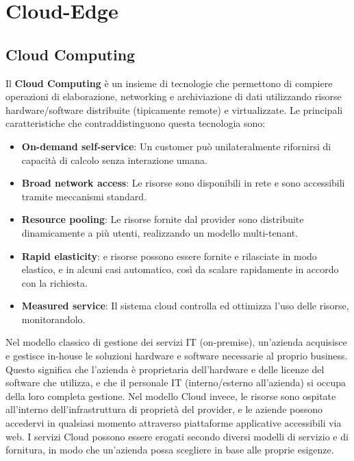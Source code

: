\chapter{Cloud-Edge}

\section{Cloud Computing}
Il \textbf{Cloud Computing} è un insieme di tecnologie che permettono di compiere operazioni
di elaborazione, networking e archiviazione di dati utilizzando risorse hardware/software distribuite (tipicamente remote) e virtualizzate. Le principali caratteristiche che contraddistinguono questa tecnologia sono:
\begin{itemize}
	\item \textbf{On-demand self-service}: Un customer può unilateralmente rifornirsi di
	capacità di calcolo senza interazione umana.
	\item \textbf{Broad network access}: Le risorse sono disponibili in rete e sono accessibili
	tramite meccanismi standard.
	\item \textbf{Resource pooling}: Le risorse fornite dal provider sono distribuite
	dinamicamente a più utenti, realizzando un modello multi-tenant.
	\item \textbf{Rapid elasticity}: e risorse possono essere fornite e rilasciate in modo elastico, e in alcuni casi automatico, così da scalare rapidamente in accordo con la
	richiesta.
	\item \textbf{Measured service}: Il sistema cloud controlla ed ottimizza l'uso delle risorse,
	monitorandolo.
\end{itemize}
Nel modello classico di gestione dei servizi IT (on-premise), un’azienda acquisisce e
gestisce in-house le soluzioni hardware e software necessarie al proprio business. Questo significa che l’azienda è proprietaria dell’hardware e delle licenze del software che utilizza, e che il personale IT (interno/esterno all’azienda) si occupa della loro completa gestione. Nel modello Cloud invece, le risorse sono ospitate all’interno dell’infrastruttura di
proprietà del provider, e le aziende possono accedervi in qualsiasi momento attraverso
piattaforme applicative accessibili via web. I servizi Cloud possono essere erogati secondo diversi modelli di servizio e di fornitura, in modo che un’azienda possa scegliere in base alle proprie esigenze.

